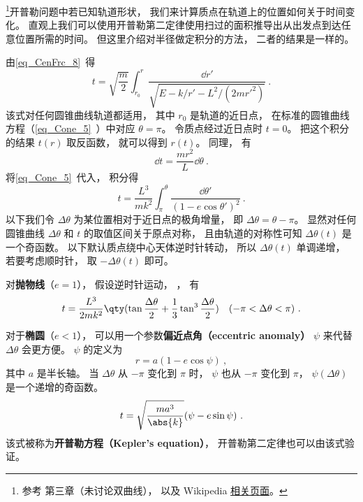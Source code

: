 

\footnote{参考 \cite{Goldstein} 第三章（未讨论双曲线）， 以及 Wikipedia \href{https://en.wikipedia.org/wiki/Kepler's_equation}{相关页面}。 }开普勒问题中若已知轨道形状， 我们来计算质点在轨道上的位置如何关于时间变化。 直观上我们可以使用开普勒第二定律使用扫过的面积推导出从出发点到达任意位置所需的时间。 但这里介绍对半径做定积分的方法， 二者的结果是一样的。

由\autoref{eq_CenFrc_8}~得
\begin{equation}
t = \sqrt{\frac{m}{2}} \int_{r_0}^r \frac{\dd{r'}}{\sqrt{E - k/r' - L^2/(2mr'^2)}}~.
\end{equation}
该式对任何圆锥曲线轨道都适用， 其中 $r_0$ 是轨道的近日点， 在标准的圆锥曲线方程（\autoref{eq_Cone_5}~）中对应 $\theta = \pi$。 令质点经过近日点时 $t= 0$。 把这个积分的结果 $t(r)$ 取反函数， 就可以得到 $r(t)$。 同理， 有
\begin{equation}
\dd{t} = \frac{mr^2}{L}\dd{\theta}~.
\end{equation}
将\autoref{eq_Cone_5}~代入， 积分得
\begin{equation}
t = \frac{L^3}{mk^2} \int_{\pi}^\theta \frac{\dd{\theta'}}{(1 - e\cos \theta')^2 }~.
\end{equation}
以下我们令 $\Delta\theta$ 为某位置相对于近日点的极角增量， 即 $\Delta \theta = \theta - \pi$。 显然对任何圆锥曲线 $\Delta \theta$ 和 $t$ 的取值区间关于原点对称， 且由轨道的对称性可知 $\Delta\theta(t)$ 是一个奇函数。 以下默认质点绕中心天体逆时针转动， 所以 $\Delta\theta(t)$ 单调递增， 若要考虑顺时针， 取 $-\Delta\theta(t)$ 即可。

对\textbf{抛物线}（$e = 1$）， 假设逆时针运动， ， 有
\begin{equation}\label{eq_EqMoKp_3}
t = \frac{L^3}{2mk^2} \qty(\tan\frac{\Delta\theta}{2} +  \frac{1}{3}\tan^3 \frac{\Delta\theta}{2})\quad (-\pi<\Delta\theta<\pi)~.
\end{equation}

对于\textbf{椭圆}（$e < 1$）， 可以用一个参数\textbf{偏近点角（eccentric anomaly）} $\psi$ 来代替 $\Delta\theta$ 会更方便。 $\psi$ 的定义为
\begin{equation}\label{eq_EqMoKp_1}
r = a(1-e\cos\psi)~,
\end{equation}
其中 $a$ 是半长轴。 当 $\Delta\theta $ 从 $-\pi$ 变化到 $\pi$ 时， $\psi$ 也从 $-\pi$ 变化到 $\pi$， $\psi(\Delta\theta)$ 是一个递增的奇函数。
\begin{equation}\label{eq_EqMoKp_5}
t = \sqrt{\frac{ma^3}{\abs{k}}} (\psi - e \sin\psi)~.
\end{equation}
该式被称为\textbf{开普勒方程（Kepler's equation）}， 开普勒第二定律也可以由该式验证。


